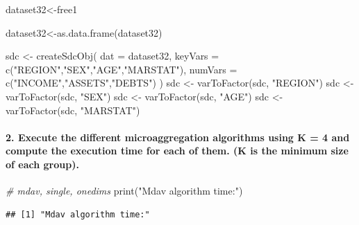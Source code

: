 \documentclass[
]{article}
\newenvironment{Shaded}{\begin{snugshade}}{\end{snugshade}}
\newcommand{\AttributeTok}[1]{\textcolor[rgb]{0.77,0.63,0.00}{#1}}
\newcommand{\CommentTok}[1]{\textcolor[rgb]{0.56,0.35,0.01}{\textit{#1}}}
\newcommand{\FunctionTok}[1]{\textcolor[rgb]{0.00,0.00,0.00}{#1}}
\newcommand{\NormalTok}[1]{#1}
\newcommand{\OtherTok}[1]{\textcolor[rgb]{0.56,0.35,0.01}{#1}}
\newcommand{\StringTok}[1]{\textcolor[rgb]{0.31,0.60,0.02}{#1}}
\begin{document}
\begin{Shaded}
\begin{Highlighting}[]
\NormalTok{dataset32}\OtherTok{\textless{}{-}}\NormalTok{free1}

\NormalTok{dataset32}\OtherTok{\textless{}{-}}\FunctionTok{as.data.frame}\NormalTok{(dataset32)}

\NormalTok{sdc }\OtherTok{\textless{}{-}} \FunctionTok{createSdcObj}\NormalTok{(}
  \AttributeTok{dat =}\NormalTok{ dataset32,}
  \AttributeTok{keyVars =} \FunctionTok{c}\NormalTok{(}\StringTok{"REGION"}\NormalTok{,}\StringTok{"SEX"}\NormalTok{,}\StringTok{"AGE"}\NormalTok{,}\StringTok{"MARSTAT"}\NormalTok{),}
  \AttributeTok{numVars =} \FunctionTok{c}\NormalTok{(}\StringTok{"INCOME"}\NormalTok{,}\StringTok{"ASSETS"}\NormalTok{,}\StringTok{"DEBTS"}\NormalTok{)}
\NormalTok{)}
\NormalTok{sdc }\OtherTok{\textless{}{-}} \FunctionTok{varToFactor}\NormalTok{(sdc, }\StringTok{"REGION"}\NormalTok{)}
\NormalTok{sdc }\OtherTok{\textless{}{-}} \FunctionTok{varToFactor}\NormalTok{(sdc, }\StringTok{"SEX"}\NormalTok{)}
\NormalTok{sdc }\OtherTok{\textless{}{-}} \FunctionTok{varToFactor}\NormalTok{(sdc, }\StringTok{"AGE"}\NormalTok{)}
\NormalTok{sdc }\OtherTok{\textless{}{-}} \FunctionTok{varToFactor}\NormalTok{(sdc, }\StringTok{"MARSTAT"}\NormalTok{)}
\end{Highlighting}
\end{Shaded}

\hypertarget{execute-the-different-microaggregation-algorithms-using-k-4-and-compute-the-execution-time-for-each-of-them.-k-is-the-minimum-size-of-each-group.}{%
\paragraph{2. Execute the different microaggregation algorithms using K
= 4 and compute the execution time for each of them. (K is the minimum
size of each
group).}\label{execute-the-different-microaggregation-algorithms-using-k-4-and-compute-the-execution-time-for-each-of-them.-k-is-the-minimum-size-of-each-group.}}

\begin{Shaded}
\begin{Highlighting}[]
\CommentTok{\# mdav, single, onedims}
\FunctionTok{print}\NormalTok{(}\StringTok{"Mdav algorithm time:"}\NormalTok{)}
\end{Highlighting}
\end{Shaded}

\begin{verbatim}
## [1] "Mdav algorithm time:"
\end{verbatim}
\end{document}
